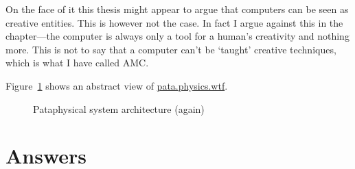 On the face of it this thesis might appear to argue that computers can be seen as creative entities. This is however not the case. In fact I argue against this in the  chapter---the computer is always only a tool for a human's creativity and nothing more. This is not to say that a computer can't be `taught' creative techniques, which is what I have called \ac{AMC}.



Figure~\ref{fig:patarc2} shows an abstract view of \url{pata.physics.wtf}.

\begin{figure}[!htbp]
  \centering
  \caption[Pataphysical system architecture (again)]{Pataphysical system architecture (again)}
  \label{fig:patarc2}
\end{figure}


\section{Answers}
\label{s:answers}

